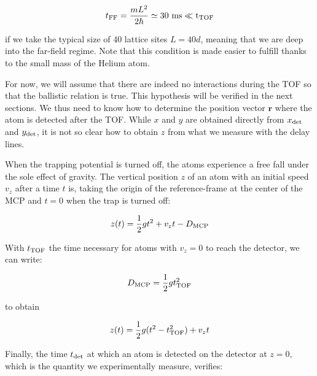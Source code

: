 \begin{equation}
    t_{\rm{FF}} = \frac{mL^2}{2 \hbar} \simeq 30 \ \rm{ms} \ll t_{\rm{TOF}}
\end{equation}

\noindent if we take the typical size of 40 lattice sites $L=40d$, meaning that we are deep into the far-field regime. Note that this condition is made easier to fulfill thanks to the small mass of the Helium atom. 

For now, we will assume that there are indeed no interactions during the TOF so that the ballistic relation is true. This hypothesis will be verified in the next sections. We thus need to know how to determine the position vector $\bm{r}$ where the atom is detected after the TOF. While $x$ and $y$ are obtained directly from $x_{\rm{det}}$ and $y_{\rm{det}}$, it is not so clear how to obtain $z$ from what we measure with the delay lines.


When the trapping potential is turned off, the atoms experience a free fall under the sole effect of gravity. The vertical position $z$ of an atom with an initial speed $v_z$ after a time $t$ is, taking the origin of the reference-frame at the center of the MCP and $t=0$ when the trap is turned off:

\begin{equation}
    z(t)= \frac{1}{2} gt^2 + v_z t -  D_{\rm{MCP}}
\end{equation}


\noindent With $t_{\rm{TOF}}$ the time necessary for atoms with $v_z=0$ to reach the detector, we can write:

\begin{equation}
    D_{\rm{MCP}} = \frac{1}{2} g t_{\rm{TOF}}^2
\end{equation}

\noindent to obtain

\begin{equation}
     z(t)= \frac{1}{2} g(t^2-t_{\rm{TOF}}^2) + v_z t
\end{equation}


\noindent Finally, the time $t_{\rm{det}}$ at which an atom is detected on the detector at $z=0$, which is the quantity we experimentally measure, verifies:

